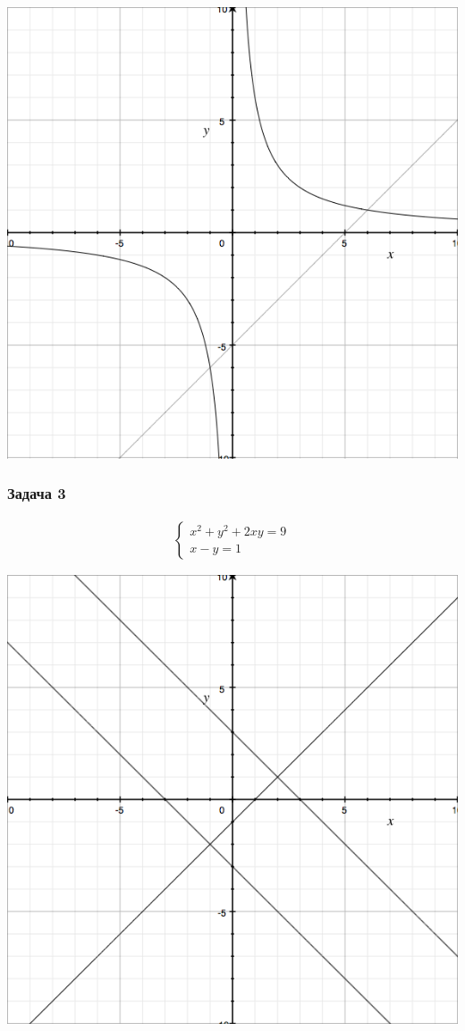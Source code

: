 \documentclass[]{article}
\begin{document}
\begingroup
\centering
\includegraphics[scale=0.3]{graph2}
\endgroup

\subsubsection{Задача 3}
\label{ts:task3}
\begin{gather*}
\begin{cases}
x^2+y^2+2xy=9\\
x-y=1
\end{cases}
\end{gather*}

\begingroup
\centering
\includegraphics[scale=0.3]{graph3}
\endgroup
\end{document}
